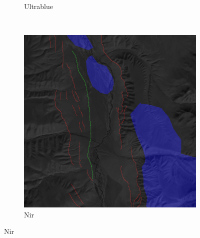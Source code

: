 \documentclass[11pt,a4paper]{article}
\begin{document}
\begin{figure}[t]
\begin{subfigure}[b]{0.18\textwidth}
        \caption{Ultrablue}
        \label{fig:features_ultrablue}
    \end{subfigure}
    ~
    \begin{subfigure}[b]{0.18\textwidth}
        \includegraphics[width=\textwidth]{graphics/data/0/features_nir.png}
        \caption{Nir}
        \label{fig:features_nir}
    \end{subfigure}


\end{figure}
\end{document}
